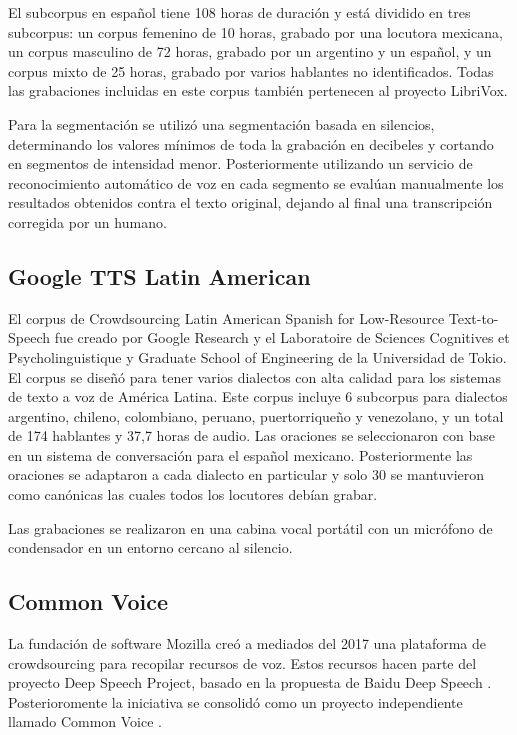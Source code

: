 El subcorpus en español tiene 108 horas de duración y está  dividido en tres subcorpus: un corpus femenino de 10 horas, grabado por una locutora mexicana, un corpus masculino de 72 horas, grabado por un argentino y un español, y un corpus mixto de 25 horas, grabado por varios hablantes no identificados. Todas las grabaciones incluidas en este corpus también pertenecen al proyecto LibriVox.

Para la segmentación se utilizó una segmentación basada en silencios, determinando los valores mínimos de toda la grabación en decibeles y cortando en segmentos de intensidad menor. Posteriormente utilizando un servicio de reconocimiento automático de voz en cada segmento se evalúan manualmente los resultados obtenidos contra el texto original, dejando al final una transcripción corregida por un humano.



\subsection{Google TTS Latin American}

El corpus de Crowdsourcing Latin American Spanish for Low-Resource Text-to-Speech \cite{googleTTSLatinAmericanSpanishCorpus} fue creado por Google Research y el Laboratoire de Sciences Cognitives et Psycholinguistique y Graduate School of Engineering de la Universidad de Tokio. El corpus se diseñó para tener varios dialectos con alta calidad para los sistemas de texto a voz de América Latina. Este corpus incluye 6 subcorpus para dialectos argentino, chileno, colombiano, peruano, puertorriqueño y venezolano, y un total de 174 hablantes y 37,7 horas de audio. Las oraciones se seleccionaron con base en un sistema de conversación para el español mexicano. Posteriormente las oraciones se adaptaron a cada dialecto en particular y solo 30 se mantuvieron como canónicas las cuales todos los locutores debían grabar.

Las grabaciones se realizaron en una cabina vocal portátil con un micrófono de condensador en un entorno cercano al silencio.

\subsection{Common Voice}

La fundación de software Mozilla creó a mediados del 2017 una plataforma de crowdsourcing para recopilar recursos de voz. Estos recursos hacen parte del proyecto Deep Speech Project, basado en la propuesta de Baidu Deep Speech \cite{deepspeeh}. Posterioromente la iniciativa se consolidó como un proyecto independiente llamado Common Voice \cite{Common-Voice}.

